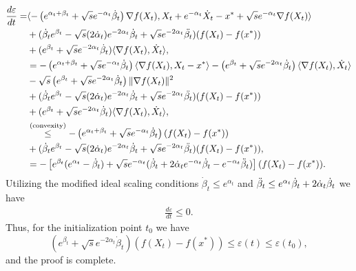 \documentclass{article}
\theoremstyle{plain}
\theoremstyle{definition}
\theoremstyle{remark}
\begin{document}
\begin{align}
     \frac{d \varepsilon}{dt}=& \langle -\left(e^{\alpha_t+\beta_t}+\sqrt{s}e^{-\alpha_t}\dot \beta_t \right)\nabla f(X_t),X_t+e^{-\alpha_t}\dot X_t-x^*+\sqrt{s}e^{-\alpha_t}\nabla f(X_t) \rangle \nonumber \\
     &+(\dot \beta_te^{\beta_t}-\sqrt{s}(2\dot \alpha_t)e^{-2\alpha_t}\dot \beta_t +\sqrt{s}e^{-2\alpha_t}\Ddot{\beta_t})(f(X_t)-f(x^*))\nonumber\\
    &+(e^{\beta_t}+\sqrt{s}e^{-2\alpha_t}\dot \beta_t)\langle\nabla f(X_t),\dot X_t\rangle,\nonumber\\
     &= -\left(e^{\alpha_t+\beta_t}+\sqrt{s}e^{-\alpha_t}\dot \beta_t \right)\langle\nabla f(X_t),X_t-x^*\rangle -\left(e^{\beta_t}+\sqrt{s}e^{-2\alpha_t}\dot \beta_t \right)\langle \nabla f(X_t),\dot X_t\rangle \nonumber\\
     &-\sqrt{s}\left(e^{\beta_t}+\sqrt{s}e^{-2\alpha_t}\dot \beta_t \right)\|\nabla f(X_t)\|^2\nonumber\\
     &+(\dot \beta_te^{\beta_t}-\sqrt{s}(2\dot \alpha_t)e^{-2\alpha_t}\dot \beta_t +\sqrt{s}e^{-2\alpha_t}\Ddot{\beta_t})(f(X_t)-f(x^*))\nonumber\\
    &+(e^{\beta_t}+\sqrt{s}e^{-2\alpha_t}\dot \beta_t)\langle\nabla f(X_t),\dot X_t\rangle,\nonumber\\
     & \overset{\text{(convexity)}}{\leq} -\left(e^{\alpha_t+\beta_t}+\sqrt{s}e^{-\alpha_t}\dot \beta_t \right)(f(X_t)-f(x^*))\nonumber\\
     &+(\dot \beta_te^{\beta_t}-\sqrt{s}(2\dot \alpha_t)e^{-2\alpha_t}\dot \beta_t +\sqrt{s}e^{-2\alpha_t}\Ddot{\beta_t})(f(X_t)-f(x^*)),\nonumber\\
     & = -\left[e^{\beta_t}(e^{\alpha_t}-\dot \beta_t)+\sqrt{s}e^{-\alpha_t}(\dot \beta_t+2\dot \alpha_t e^{-\alpha_t}\dot \beta_t-e^{-\alpha_t}\Ddot{\beta}_t)\right](f(X_t)-f(x^*)).\nonumber
\end{align}
Utilizing the modified ideal scaling conditions $\dot \beta_t\leq e^{\alpha_t}$ and $\Ddot{\beta}_t\leq e^{\alpha_t}\dot \beta_t + 2\dot \alpha_t \dot \beta_t$ we have
\begin{align}
     \frac{d \varepsilon}{dt}\leq 0.\nonumber
\end{align}
Thus, for the initialization point $t_0$ we have
$$(e^{\beta_t}+\sqrt{s}e^{-2\alpha_t}\dot \beta_t)(f(X_t)-f(x^*))\leq \varepsilon(t)\leq \varepsilon(t_0),$$
and the proof is complete.
\end{document}
